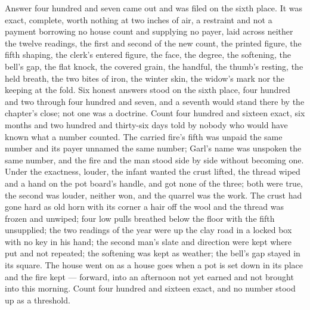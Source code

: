 Answer four hundred and seven came out and was filed on the sixth place. It was exact, complete, worth nothing at two inches of air, a restraint and not a payment borrowing no house count and supplying no payer, laid across neither the twelve readings, the first and second of the new count, the printed figure, the fifth shaping, the clerk's entered figure, the face, the degree, the softening, the bell's gap, the flat knock, the covered grain, the handful, the thumb's resting, the held breath, the two bites of iron, the winter skin, the widow's mark nor the keeping at the fold. Six honest answers stood on the sixth place, four hundred and two through four hundred and seven, and a seventh would stand there by the chapter's close; not one was a doctrine. Count four hundred and sixteen exact, six months and two hundred and thirty-six days told by nobody who would have known what a number counted. The carried fire's fifth was unpaid the same number and its payer unnamed the same number; Garl's name was unspoken the same number, and the fire and the man stood side by side without becoming one. Under the exactness, louder, the infant wanted the crust lifted, the thread wiped and a hand on the pot board's handle, and got none of the three; both were true, the second was louder, neither won, and the quarrel was the work. The crust had gone hard as old horn with its corner a hair off the wool and the thread was frozen and unwiped; four low pulls breathed below the floor with the fifth unsupplied; the two readings of the year were up the clay road in a locked box with no key in his hand; the second man's slate and direction were kept where put and not repeated; the softening was kept as weather; the bell's gap stayed in its square. The house went on as a house goes when a pot is set down in its place and the fire kept --- forward, into an afternoon not yet earned and not brought into this morning. Count four hundred and sixteen exact, and no number stood up as a threshold.

